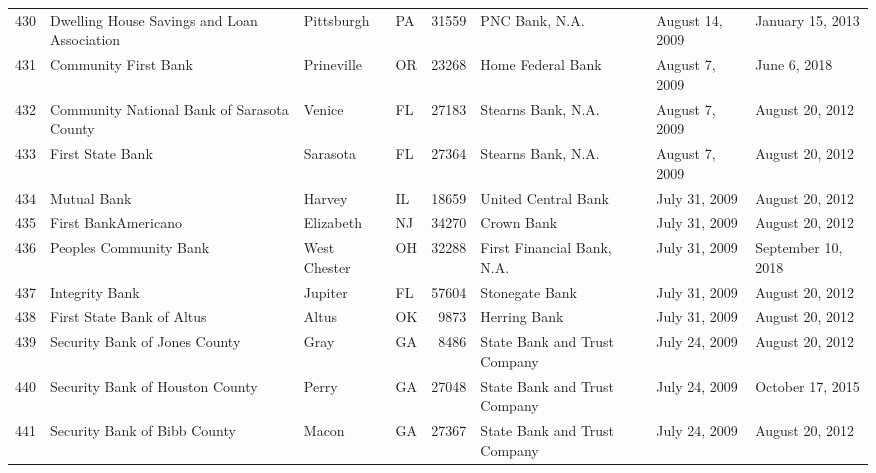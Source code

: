 \begin{tabular}{llllrlll}
430 &        Dwelling House Savings and Loan Association &          Pittsburgh &  PA &  31559 &                                     PNC Bank, N.A. &     August 14, 2009 &    January 15, 2013 \\
431 &                               Community First Bank &          Prineville &  OR &  23268 &                                  Home Federal Bank &      August 7, 2009 &        June 6, 2018 \\
432 &         Community National Bank of Sarasota County &              Venice &  FL &  27183 &                                 Stearns Bank, N.A. &      August 7, 2009 &     August 20, 2012 \\
433 &                                   First State Bank &            Sarasota &  FL &  27364 &                                 Stearns Bank, N.A. &      August 7, 2009 &     August 20, 2012 \\
434 &                                        Mutual Bank &              Harvey &  IL &  18659 &                                United Central Bank &       July 31, 2009 &     August 20, 2012 \\
435 &                                First BankAmericano &           Elizabeth &  NJ &  34270 &                                         Crown Bank &       July 31, 2009 &     August 20, 2012 \\
436 &                             Peoples Community Bank &        West Chester &  OH &  32288 &                         First Financial Bank, N.A. &       July 31, 2009 &  September 10, 2018 \\
437 &                                     Integrity Bank &             Jupiter &  FL &  57604 &                                     Stonegate Bank &       July 31, 2009 &     August 20, 2012 \\
438 &                          First State Bank of Altus &               Altus &  OK &   9873 &                                       Herring Bank &       July 31, 2009 &     August 20, 2012 \\
439 &                      Security Bank of Jones County &                Gray &  GA &   8486 &                       State Bank and Trust Company &       July 24, 2009 &     August 20, 2012 \\
440 &                    Security Bank of Houston County &               Perry &  GA &  27048 &                       State Bank and Trust Company &       July 24, 2009 &    October 17, 2015 \\
441 &                       Security Bank of Bibb County &               Macon &  GA &  27367 &                       State Bank and Trust Company &       July 24, 2009 &     August 20, 2012 \\

\end{tabular}
